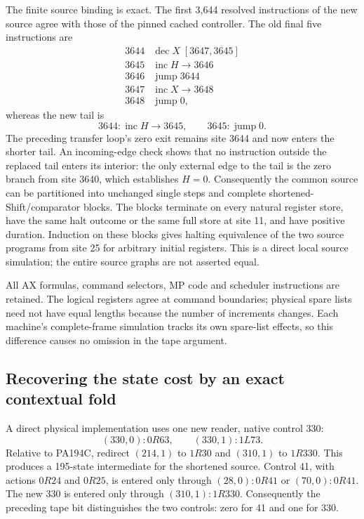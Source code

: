 The finite source binding is exact. The first 3,644 resolved instructions
of the new source agree with those of the pinned cached controller.
The old final five instructions are
\[
\begin{array}{r|l}
3644&\operatorname{dec}X\;[3647,3645]\\
3645&\operatorname{inc}H\to3646\\
3646&\operatorname{jump}3644\\
3647&\operatorname{inc}X\to3648\\
3648&\operatorname{jump}0,
\end{array}
\]
whereas the new tail is
\[
             3644:\operatorname{inc}H\to3645,
             \qquad3645:\operatorname{jump}0.
\]
The preceding transfer loop's zero exit remains site 3644 and now enters
the shorter tail. An incoming-edge check shows that no instruction outside
the replaced tail enters its interior: the only external edge to the tail
is the zero branch from site 3640, which establishes $H=0$. Consequently
the common source can be partitioned into unchanged single steps and
complete shortened-Shift/comparator blocks. The blocks terminate on every
natural register store, have the same halt outcome or the same full store
at site 11, and have positive duration. Induction on these blocks gives
halting equivalence of the two source programs from site 25 for arbitrary
initial registers. This is a direct local source simulation; the entire
source graphs are not asserted equal.

All AX formulas, command selectors, MP code and scheduler instructions
are retained. The logical registers agree at command
boundaries; physical spare lists need not have equal lengths because the
number of increments changes. Each machine's complete-frame simulation
tracks its own spare-list effects, so this difference causes no omission
in the tape argument.

\subsection{Recovering the state cost by an exact contextual fold}

A direct physical implementation uses one new reader, native control 330:
\[
 (330,0):0R63,\qquad(330,1):1L73.
\]
Relative to PA194C, redirect $(214,1)$ to $1R30$ and $(310,1)$ to
$1R330$. This produces a 195-state intermediate for the shortened source.
Control 41, with actions $0R24$ and $0R25$, is entered only through
$(28,0):0R41$ or $(70,0):0R41$. The new 330 is entered only through
$(310,1):1R330$. Consequently the preceding tape bit distinguishes the
two controls: zero for 41 and one for 330.

